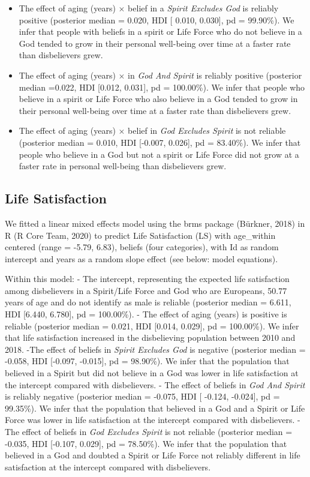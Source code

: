 \documentclass[
  english,
  man,floatsintext]{apa6}
\providecommand{\tightlist}{%
  \setlength{\itemsep}{0pt}\setlength{\parskip}{0pt}}
\begin{document}
\begin{itemize}
\tightlist
\item
  The effect of aging (years) \(\times\) belief in a \emph{Spirit Excludes God} is reliably positive (posterior median = 0.020, HDI {[} 0.010, 0.030{]}, pd = 99.90\%). We infer that people with beliefs in a spirit or Life Force who do not believe in a God tended to grow in their personal well-being over time at a faster rate than disbelievers grew.
\item
  The effect of aging (years) \(\times\) in \emph{God And Spirit} is reliably positive (posterior median =0.022, HDI {[}0.012, 0.031{]}, pd = 100.00\%). We infer that people who believe in a spirit or Life Force who also believe in a God tended to grow in their personal well-being over time at a faster rate than disbelievers grew.
\item
  The effect of aging (years) \(\times\) belief in \emph{God Excludes Spirit} is not reliable (posterior median = 0.010, HDI {[}-0.007, 0.026{]}, pd = 83.40\%). We infer that people who believe in a God but not a spirit or Life Force did not grow at a faster rate in personal well-being than disbelievers grew.
\end{itemize}

\hypertarget{life-satisfaction-1}{%
\subsection{Life Satisfaction}\label{life-satisfaction-1}}

We fitted a linear mixed effects model using the brms package (Bürkner, 2018) in R (R Core Team, 2020) to predict Life Satisfaction (LS) with age\_within centered (range = -5.79, 6.83), beliefs (four categories), with Id as random intercept and years as a random slope effect (see below: model equations).

Within this model:
- The intercept, representing the expected life satisfaction among disbelievers in a Spirit/Life Force and God who are Europeans, 50.77 years of age and do not identify as male is reliable (posterior median = 6.611, HDI {[}6.440, 6.780{]}, pd = 100.00\%).
- The effect of aging (years) is positive is reliable (posterior median = 0.021, HDI {[}0.014, 0.029{]}, pd = 100.00\%). We infer that life satisfaction increased in the disbelieving population between 2010 and 2018.
-The effect of beliefs in \emph{Spirit Excludes God} is negative (posterior median = -0.058, HDI {[}-0.097, -0.015{]}, pd = 98.90\%). We infer that the population that believed in a Spirit but did not believe in a God was lower in life satisfaction at the intercept compared with disbelievers.
- The effect of beliefs in \emph{God And Spirit} is reliably negative (posterior median = -0.075, HDI {[} -0.124, -0.024{]}, pd = 99.35\%). We infer that the population that believed in a God and a Spirit or Life Force was lower in life satisfaction at the intercept compared with disbelievers.
- The effect of beliefs in \emph{God Excludes Spirit} is not reliable (posterior median = -0.035, HDI {[}-0.107, 0.029{]}, pd = 78.50\%). We infer that the population that believed in a God and doubted a Spirit or Life Force not reliably different in life satisfaction at the intercept compared with disbelievers.
\end{document}
